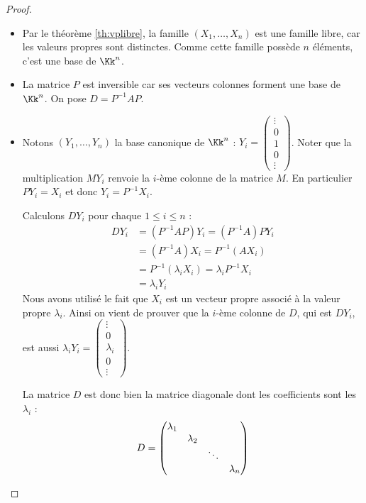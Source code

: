 \documentclass[11pt, class=report,crop=false]{standalone}
\begin{document}
\begin{proof}~

\begin{itemize}
  \item Par le théorème \ref{th:vplibre}, la famille $(X_1,\ldots,X_n)$ est une famille libre, car les valeurs propres sont distinctes. Comme cette famille possède $n$ éléments, c'est une base de $\Kk^n$.
  
  \item La matrice $P$ est inversible car ses vecteurs colonnes forment une base de $\Kk^n$.
  On pose $D=P^{-1}AP$.
  
  \item Notons $(Y_1,\ldots,Y_n)$ la base canonique de $\Kk^n$ :  $Y_i = \left(\begin{smallmatrix}\vdots\\0\\1\\0 \\\vdots\end{smallmatrix}\right)$.
 Noter que la multiplication $M Y_i$ renvoie la $i$-ème colonne de la matrice $M$. En particulier 
 $PY_i = X_i$ et donc $Y_i = P^{-1}X_i$. 
  
  Calculons $DY_i$ pour chaque $1\le i \le n$ :  
  \begin{align*}
  DY_i & = (P^{-1}AP) Y_i 
        = (P^{-1}A)P Y_i \\
       & = (P^{-1}A)X_i 
        = P^{-1} (AX_i) \\
       & = P^{-1} (\lambda_i X_i) 
        = \lambda_i P^{-1} X_i \\
       &= \lambda_i Y_i
  \end{align*}
  Nous avons utilisé le fait que $X_i$ est un vecteur propre associé à la valeur propre $\lambda_i$.
  Ainsi on vient de prouver que la $i$-ème colonne de $D$, qui est $DY_i$, est aussi
  $\lambda_i Y_i = \left(\begin{smallmatrix}\vdots\\0\\\lambda_i\\0 \\\vdots\end{smallmatrix}\right)$.
  
  La matrice $D$ est donc bien la matrice diagonale dont les coefficients sont les $\lambda_i$ :
    $$D = \begin{pmatrix}
\lambda_{1}&&& \cr
&\lambda_{2}&&\cr
&& \ddots &\cr
&&& \lambda_{n} \cr
\end{pmatrix}$$ 
\end{itemize}

\end{proof}
\end{document}
